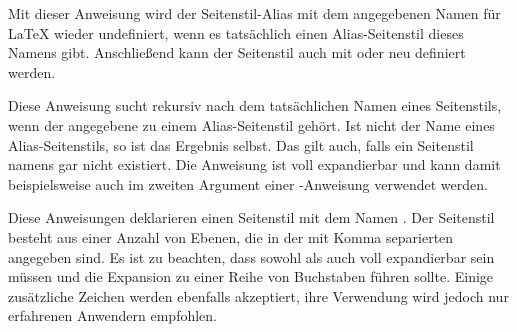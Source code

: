 \begin{Declaration}
\end{Declaration}
%
%
Mit dieser Anweisung wird der Seitenstil-Alias mit dem angegebenen Namen
 für \LaTeX{} wieder undefiniert, wenn es
tatsächlich einen Alias-Seitenstil dieses Namens gibt. Anschließend kann der
Seitenstil auch mit  oder
 neu definiert werden.%
\EndIndexGroup


\begin{Declaration}
\end{Declaration}
%
%
Diese Anweisung sucht rekursiv nach dem tatsächlichen Namen eines
Seitenstils, wenn der angegebene  zu einem
Alias-Seitenstil gehört. Ist  nicht der Name eines
Alias-Seitenstils, so ist das Ergebnis  selbst. Das
gilt auch, falls ein Seitenstil namens  gar nicht
existiert. Die Anweisung ist voll expandierbar und kann damit beispielsweise
auch im zweiten Argument einer -Anweisung verwendet werden.%
\EndIndexGroup


\begin{Declaration}
\end{Declaration}
%
%
Diese Anweisungen deklarieren einen Seitenstil mit dem Namen
. Der Seitenstil besteht aus einer Anzahl von Ebenen,
die in der mit Komma separierten  angegeben sind. Es ist zu
beachten, dass sowohl  als auch
 voll expandierbar sein müssen und die Expansion zu einer
Reihe von Buchstaben führen sollte. Einige zusätzliche Zeichen werden
ebenfalls akzeptiert, ihre Verwendung wird jedoch nur erfahrenen Anwendern
empfohlen.


